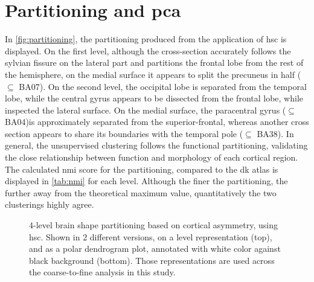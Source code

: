 \section{Partitioning and \acs{pca}}
In \autoref{fig:partitioning}, the partitioning produced from the application of \ac{hsc} is displayed. On the first level, although the cross-section accurately follows the sylvian fissure on the lateral part and partitions the frontal lobe from the rest of the hemisphere, on the medial surface it appears to split the precuneus in half ($\subseteq$ BA07). On the second level, the occipital lobe is separated from the temporal lobe, while the central gyrus appears to be dissected from the frontal lobe, while inspected the lateral surface. On the medial surface, the paracentral gyrus ($\subseteq$ BA04)is approximately separated from the superior-frontal, whereas another cross section appears to share its boundaries with the temporal pole ($\subseteq$ BA38). In general, the unsupervised clustering follows the functional partitioning, validating the close relationship  between function and morphology of each cortical region. The calculated \ac{nmi} score for the partitioning, compared to the \ac{dk} atlas is displayed in \autoref{tab:nmi} for each level. Although the finer the partitioning, the further away from the theoretical maximum value, quantitatively the two clusterings highly agree.

\begin{figure}[H]
	\begin{adjustwidth}{-4cm}{-4cm}
	\centering
	\subfloat[]{
		
	}\quad
	\subfloat[]{
		
	}

\end{adjustwidth}
\caption[4-level brain shape partitioning based on asymmetry]{4-level brain shape partitioning based on cortical asymmetry, using \ac{hsc}. Shown in 2 different versions, on a level representation (top), and as a polar dendrogram plot, annotated with white color against black background (bottom). Those representations are used across the coarse-to-fine analysis in this study.}
\label{fig:partitioning}
\end{figure}

